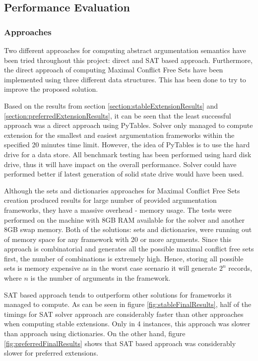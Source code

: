 \subsection{Performance Evaluation}

\subsubsection{Approaches} 
Two different approaches for computing abstract argumentation semantics have been tried throughout this project: direct and SAT based approach. Furthermore, the direct approach of computing Maximal Conflict Free Sets have been implemented using three different data structures. This has been done to try to improve the proposed solution. 

Based on the results from section \ref{section:stableExtensionResults} and \ref{section:preferredExtensionResults}, it can be seen that the least successful approach was a direct approach using PyTables. Solver only managed to compute extension for the smallest and easiest argumentation frameworks within the specified 20 minutes time limit. However, the idea of PyTables is to use the hard drive for a data store. All benchmark testing has been performed using hard disk drive, thus it will have impact on the overall performance. Solver could have performed better if latest generation of solid state drive would have been used. 

Although the sets and dictionaries approaches for Maximal Conflict Free Sets creation produced results for large number of provided argumentation frameworks, they have a massive overhead - memory usage. The tests were performed on the machine with 8GB RAM available for the solver and another 8GB swap memory. Both of the solutions: sets and dictionaries, were running out of memory space for any framework with 20 or more arguments. Since this approach is combinatorial and  generates all the possible maximal conflict free sets first, the number of combinations is extremely high. Hence, storing all possible sets is memory expensive as in the worst case scenario it will generate $2^n$ records, where $n$ is the number of arguments in the framework.

SAT based approach tends to outperform other solutions for frameworks it managed to compute. As can be seen in figure \ref{fig:stableFinalResults}, half of the timings for SAT solver approach are considerably faster than other approaches when computing stable extensions. Only in 4 instances, this approach was slower than approach using dictionaries. On the other hand, figure \ref{fig:preferredFinalResults} shows that SAT based approach was considerably slower for preferred extensions. 

